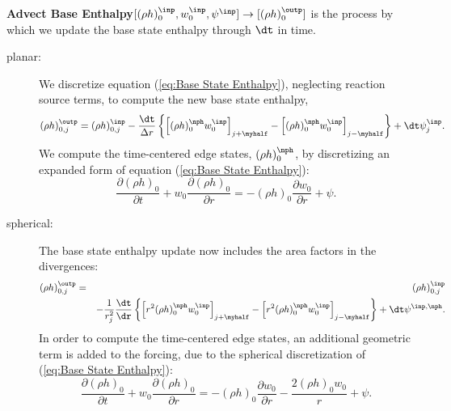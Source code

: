 {\bf Advect Base Enthalpy}$[(\rho h)_0^\inp,w_0^\inp,\psi^\inp] \rightarrow [(\rho h)_0^\outp]$
  is the process by which we update the base state enthalpy through $\dt$ in time.  
\begin{description}
\item[planar:] We discretize equation (\ref{eq:Base State Enthalpy}), neglecting reaction source terms,
  to compute the new base state enthalpy,
\begin{equation}
(\rho h)_{0,j}^{\outp} = (\rho h)_{0,j}^{\inp} - \frac{\dt}{\Delta r} \left\{ \left[ (\rho h)_0^{\nph} w_0^{\inp}\right]_{j+\myhalf} - \left[ (\rho h)_0^{\nph} w_0^{\inp}\right]_{j-\myhalf} \right\} + \dt\psi_j^{\inp}.
\end{equation}
  We compute the time-centered edge states, $(\rho h)_0^{\nph}$, by discretizing
  an expanded form of equation (\ref{eq:Base State Enthalpy}):
\begin{equation}
\frac{\partial (\rho h)_0}{\partial t} + w_0 \frac{\partial (\rho h)_0}{\partial r} = -(\rho h)_0 \frac{\partial w_0}{\partial r} + \psi.
\end{equation}
\item[spherical:]  The base state enthalpy update now includes the area factors 
  in the divergences:
\begin{eqnarray}
(\rho h)_{0,j}^{\outp} &=& (\rho h)_{0,j}^{\inp} \nonumber \\
&& - \frac{1}{r_j^2} \frac{\dt}{\dr} \left \{ \left[ r^2 (\rho h)_0^{\nph} w_0^{\inp}\right]_{j+\myhalf} - \left[ r^2 (\rho h)_0^{\nph} w_0^{\inp}\right]_{j-\myhalf} \right\} +\dt\psi^{\inp,\nph}.\nonumber\\
\end{eqnarray}
  In order to compute the time-centered edge states, an additional geometric 
  term is added to the forcing, due to the spherical discretization of 
  (\ref{eq:Base State Enthalpy}):
\begin{equation}
\frac{\partial (\rho h)_0}{\partial t} + w_0 \frac{\partial (\rho h)_0}{\partial r} = -(\rho h)_0 \frac{\partial w_0}{\partial r} - \frac{2 (\rho h)_0 w_0}{r} + \psi.
\end{equation}
\end{description}


